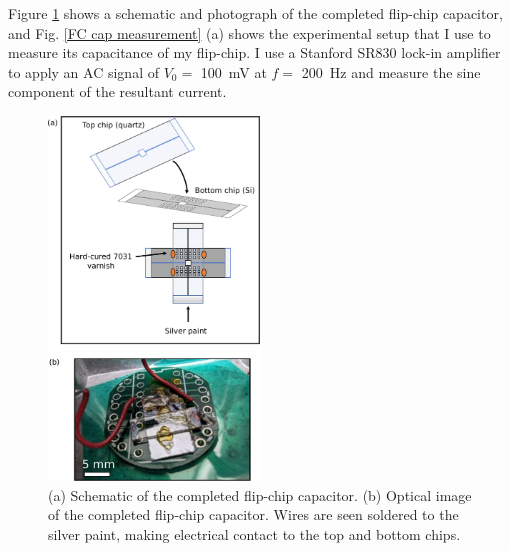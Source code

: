 \documentclass[double,12pt,1in,seploa]{beavtex}
\begin{document}
Figure \ref{flipping chips} shows a schematic and photograph of the completed flip-chip capacitor, and Fig. \ref{FC cap measurement} (a) shows the experimental setup that I use to measure its capacitance of my flip-chip. I use a Stanford SR830 lock-in amplifier to apply an AC signal of $V_0 = $ \SI{100}{\milli\volt} at $f = $ \SI{200}{\hertz} and measure the sine component of the resultant current. 

\begin{figure}
    \includegraphics[width=0.5\textwidth]{flipping chips.pdf}
    \caption{(a) Schematic of the completed flip-chip capacitor. (b) Optical image of the completed flip-chip capacitor. Wires are seen soldered to the silver paint, making electrical contact to the top and bottom chips.}
    \label{flipping chips}
\end{figure}
\end{document}
